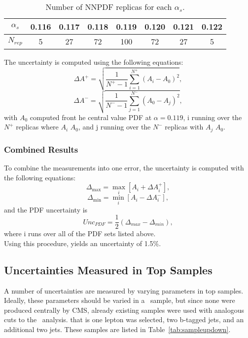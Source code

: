 \begin{table}[h]
\begin{center}
\caption{\small\label{tab:nnPDFsets} Number of NNPDF replicas for each $\alpha _s$.}
\begin{tabular}{c|ccccccc}\hline
$\alpha _s$         &  0.116 & 0.117 & 0.118 & 0.119 & 0.120 & 0.121 & 0.122 \\ \hline
$N_{rep}$                &  5         &  27      &  72      &   100   &  72     &   27    &    5       \\
\hline
\end{tabular}
\end{center}
\end{table}
The uncertainty is computed using the following equations:
\begin{equation}
\Delta A ^{+} = \sqrt{  \frac{1}{N^{+} - 1} \sum \limits_{i=1}^{N^{+}} (A_i - A_0)^2},
\end{equation}
\begin{equation}
\Delta A ^{-} = \sqrt{  \frac{1}{N^{-} - 1} \sum \limits_{j=1}^{N^{-}} (A_0 - A_j)^2},
\end{equation}
with $A_0$ computed front he central value PDF at $\alpha = 0.119$, i running over the $N^{+}$ replicas where $A_i$ \gt $A_0$, and j running over the $N^{-}$ replicas with $A_j$ \lt $A_0$.\\

\subsubsection{Combined Results}
To combine the measurements into one error, the uncertainty is computed with the following equations:
\begin{equation}
\Delta _{\max} = \underset{i}{\max}  [A_i + \Delta A^{+} _i],
\end{equation}
\begin{equation}
\Delta _{\min} = \underset{i}{\min}  [A_i - \Delta A^{-} _i],
\end{equation}
and the PDF uncertainty is
\begin{equation}
Unc_{PDF} = \frac{1}{2}(\Delta _{max} - \Delta _{min} ),
\end{equation}
where i runs over all of the PDF sets listed above.\\

Using this procedure, yields an uncertainty of 1.5\%.



\subsection{Uncertainties Measured in Top Samples}
A number of uncertainties are measured by varying parameters in top samples. Ideally, these parameters should be varied in a \ttZ \ sample, but since none were produced centrally by CMS, already existing \ttbar samples were used with analogous cuts to the \ttZ \ analysis. that is one lepton was selected, two b-tagged jets, and an additional two jets. These samples are listed in Table~\ref{tab:sampleupdown}.

